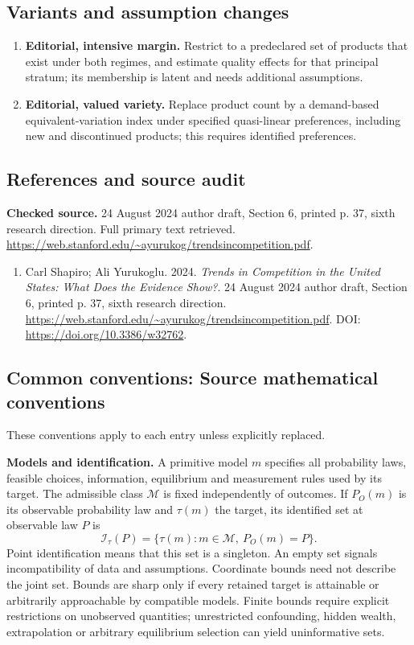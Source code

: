 \documentclass[11pt,a4paper]{article}
\begin{document}
\subsection*{Variants and assumption changes}
\begin{enumerate}
\item \textbf{Editorial, intensive margin.} Restrict to a predeclared set of products that exist under both regimes, and estimate quality effects for that principal stratum; its membership is latent and needs additional assumptions.
\item \textbf{Editorial, valued variety.} Replace product count by a demand-based equivalent-variation index under specified quasi-linear preferences, including new and discontinued products; this requires identified preferences.
\end{enumerate}
\subsection*{References and source audit}
\textbf{Checked source.} 24 August 2024 author draft, Section 6, printed p. 37, sixth research direction. Full primary text retrieved. \url{https://web.stanford.edu/~ayurukog/trendsincompetition.pdf}.
\begin{enumerate}\raggedright
\item\hypertarget{definitions:source:30007675:1}{} Carl Shapiro; Ali Yurukoglu. 2024. \emph{Trends in Competition in the United States: What Does the Evidence Show?}. 24 August 2024 author draft, Section 6, printed p. 37, sixth research direction.
\url{https://web.stanford.edu/~ayurukog/trendsincompetition.pdf}.
DOI: \url{https://doi.org/10.3386/w32762}.
\end{enumerate}

\subsection*{Common conventions: Source mathematical conventions}

These conventions apply to each entry unless explicitly replaced.

\textbf{Models and identification.} A primitive model \(m\) specifies all probability laws, feasible choices, information, equilibrium and measurement rules used by its target. The admissible class \(\mathcal M\) is fixed independently of outcomes. If \(P_O(m)\) is its observable probability law and \(\tau(m)\) the target, its identified set at observable law \(P\) is
\[
 \mathcal I_\tau(P)=\{\tau(m):m\in\mathcal M,\ P_O(m)=P\}.
\]
Point identification means that this set is a singleton. An empty set signals incompatibility of data and assumptions. Coordinate bounds need not describe the joint set. Bounds are sharp only if every retained target is attainable or arbitrarily approachable by compatible models. Finite bounds require explicit restrictions on unobserved quantities; unrestricted confounding, hidden wealth, extrapolation or arbitrary equilibrium selection can yield uninformative sets.
\end{document}
